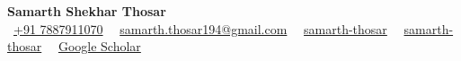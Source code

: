 \documentclass{article}
\begin{document}
\pagestyle{empty}
\begin{center}
    \textbf{\Huge{Samarth Shekhar Thosar}} \\[8pt]
    \faMobile* \ \href{tel:+917887911070}{+91 7887911070} \textbar\ 
    \faEnvelope \ \href{mailto:samarth.thosar194@gmail.com}{samarth.thosar194@gmail.com} \textbar\ 
    \faLinkedin \ \href{https://linkedin.com/in/samarth-thosar}{samarth-thosar} \textbar\ 
    \faGithub \ \href{https://github.com/samarth-thosar}{samarth-thosar} \textbar\ 
    \faGraduationCap \ \href{https://scholar.google.com/citations?user=GROqtyIAAAAJ&hl}{Google Scholar}
\end{center}

\end{document}
